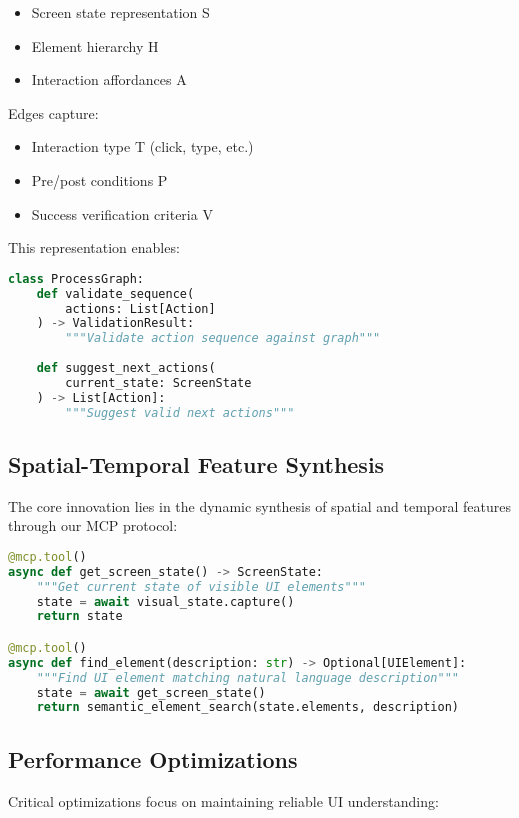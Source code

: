 \documentclass{article}
\begin{document}
\begin{itemize}
    \item Screen state representation S
    \item Element hierarchy H
    \item Interaction affordances A
\end{itemize}

Edges capture:
\begin{itemize}
    \item Interaction type T (click, type, etc.)
    \item Pre/post conditions P
    \item Success verification criteria V
\end{itemize}

This representation enables:
\begin{lstlisting}[language=Python]
class ProcessGraph:
    def validate_sequence(
        actions: List[Action]
    ) -> ValidationResult:
        """Validate action sequence against graph"""
    
    def suggest_next_actions(
        current_state: ScreenState
    ) -> List[Action]:
        """Suggest valid next actions"""
\end{lstlisting}

\subsection{Spatial-Temporal Feature Synthesis}
The core innovation lies in the dynamic synthesis of spatial and temporal features through our MCP protocol:

\begin{lstlisting}[language=Python]
@mcp.tool()
async def get_screen_state() -> ScreenState:
    """Get current state of visible UI elements"""
    state = await visual_state.capture()
    return state

@mcp.tool()
async def find_element(description: str) -> Optional[UIElement]:
    """Find UI element matching natural language description"""
    state = await get_screen_state()
    return semantic_element_search(state.elements, description)
\end{lstlisting}

\subsection{Performance Optimizations}
Critical optimizations focus on maintaining reliable UI understanding:
\end{document}
